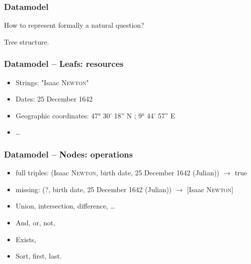 \begin{frame}[fragile]
    \frametitle{Datamodel}
    How to represent formally a natural question?

    Tree structure.
\end{frame}
\begin{frame}[fragile]
    \frametitle{Datamodel \--- Leafs: resources}
        \begin{itemize}
            \item Strings: "Isaac \textsc{Newton}"
            \item Dates: 25 December 1642
            \item Geographic coordinates: 47° 30' 18'' N ; 9° 44' 57'' E
            \item \ldots
        \end{itemize}
\end{frame}
\begin{frame}[fragile]
    \frametitle{Datamodel \--- Nodes: operations}
        \begin{itemize}
            \item full triples: (Isaac \textsc{Newton}, birth date, 25 December 1642 (Julian)) $\rightarrow$ true
            \item missing: (?, birth date, 25 December 1642 (Julian)) $\rightarrow$ [Isaac \textsc{Newton}]
            \item Union, intersection, difference, \ldots
            \item And, or, not,
            \item Exists,
            \item Sort, first, last.
        \end{itemize}
\end{frame}

